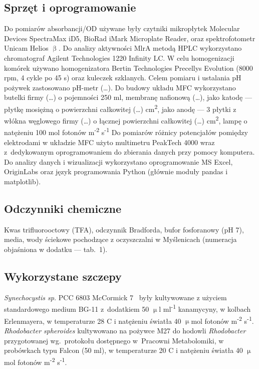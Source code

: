 \subsection{Sprzęt i oprogramowanie}\label{subsec:sprzet}
Do pomiarów absorbancji/OD używane były czytniki mikropłytek
Molecular Devices SpectraMax iD5, BioRad iMark
Microplate Reader, oraz spektrofotometr Unicam Helios $\upbeta$.
Do analizy aktywności MlrA metodą HPLC wykorzystano chromatograf
Agilent Technologies 1220 Infinity LC\@.
W celu homogenizacji komórek używano homogenizatora
Bertin Technologies Precellys Evolution (8000 rpm, 4 cykle po 45 s)
oraz kuleczek szklanych.
Celem pomiaru i ustalania pH pożywek zastosowano pH-metr (\ldots).
Do budowy układu MFC wykorzystano butelki firmy (\ldots)
o pojemności 250 ml, membranę nafionową (\ldots),
jako katodę — płytkę mosiężną o powierzchni całkowitej (\ldots)
cm\textsuperscript{2}, jako anodę — 3 płytki z włókna węglowego firmy
(\ldots) o łącznej powierzchni całkowitej (\ldots) cm\textsuperscript{2},
lampę o natężeniu 100 mol fotonów m\textsuperscript{-2} s\textsuperscript{-1}
Do pomiarów różnicy potencjałów pomiędzy elektrodami
w układzie MFC użyto multimetru PeakTech 4000 wraz
z~dedykowanym oprogramowaniem do zbierania danych przy pomocy komputera.
Do analizy danych i wizualizacji wykorzystano oprogramowanie
MS Excel, OriginLabs oraz język programowania Python
(głównie moduły pandas i matplotlib).

\subsection{Odczynniki chemiczne}\label{subsec:odczynniki}
Kwas trifluorooctowy (TFA), odczynnik Bradforda, bufor fosforanowy (pH 7),
media, wody ściekowe pochodzące z oczyszczalni w Myślenicach
(numeracja objaśniona w dodatku — tab.\ 1).

\subsection{Wykorzystane szczepy}\label{subsec:szczepy}
\textit{Synechocystis sp.} PCC 6803 McCormick 7~\cite{Puchalski2021}
były kultywowane z użyciem standardowego medium BG-11 z~dodatkiem 50
$\upmu$l ml\textsuperscript{-1} kanamycyny, w kolbach Erlenmayera,
w temperaturze 28 \degree C i natężeniu światła
40 $\upmu$mol fotonów m\textsuperscript{-2} s\textsuperscript{-1}.
\textit{Rhodobacter spheroides} kultywowano na pożywce M27
do hodowli \textit{Rhodobacter} przygotowanej wg.\ protokołu
dostępnego w~Pracowni Metabolomiki, w probówkach typu
Falcon (50 ml), w temperaturze 20 \degree C i natężeniu światła
40 $\upmu$mol fotonów m\textsuperscript{-2} s\textsuperscript{-1}.

